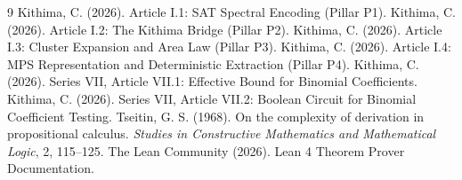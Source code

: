 \documentclass[11pt,a4paper]{article}
\begin{document}

\begin{thebibliography}{9}
  Kithima, C. (2026). Article I.1: SAT Spectral Encoding (Pillar P1).
  Kithima, C. (2026). Article I.2: The Kithima Bridge (Pillar P2).
  Kithima, C. (2026). Article I.3: Cluster Expansion and Area Law (Pillar P3).
  Kithima, C. (2026). Article I.4: MPS Representation and Deterministic Extraction (Pillar P4).
  Kithima, C. (2026). Series VII, Article VII.1: Effective Bound for Binomial Coefficients.
  Kithima, C. (2026). Series VII, Article VII.2: Boolean Circuit for Binomial Coefficient Testing.
  Tseitin, G. S. (1968). On the complexity of derivation in propositional calculus. \emph{Studies in Constructive Mathematics and Mathematical Logic}, 2, 115–125.
  The Lean Community (2026). Lean 4 Theorem Prover Documentation.
\end{thebibliography}
\end{document}
